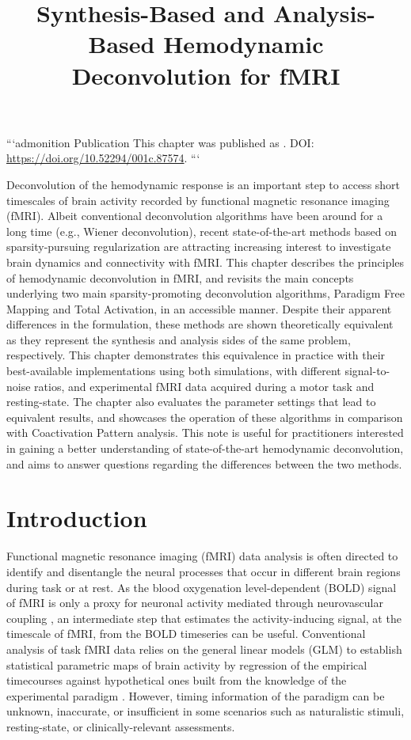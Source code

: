 \title{Synthesis-Based and Analysis-Based Hemodynamic Deconvolution for fMRI}
\label{cha:synthesis_analysis}

```{admonition} Publication
This chapter was published as
. DOI:
\url{https://doi.org/10.52294/001c.87574}.
```

Deconvolution of the hemodynamic response is an important step to access short
timescales of brain activity recorded by functional magnetic resonance imaging
(fMRI). Albeit conventional deconvolution algorithms have been around for a long
time (e.g., Wiener deconvolution), recent state-of-the-art methods based on
sparsity-pursuing regularization are attracting increasing interest to
investigate brain dynamics and connectivity with fMRI. This chapter describes
the principles of hemodynamic deconvolution in fMRI, and revisits the main
concepts underlying two main sparsity-promoting deconvolution algorithms,
Paradigm Free Mapping and Total Activation, in an accessible manner. Despite their
apparent differences in the formulation, these methods are shown theoretically
equivalent as they represent the synthesis and analysis sides of the same
problem, respectively. This chapter demonstrates this equivalence in practice
with their best-available implementations using both simulations, with different
signal-to-noise ratios, and experimental fMRI data acquired during a motor task
and resting-state. The chapter also evaluates the parameter settings that lead
to equivalent results, and showcases the operation of these algorithms in
comparison with Coactivation Pattern analysis. This note is useful for practitioners
interested in gaining a better understanding of state-of-the-art hemodynamic
deconvolution, and aims to answer questions regarding the differences between
the two methods.

\section{Introduction}
\label{sec:synthesis_introduction}

Functional magnetic resonance imaging (fMRI) data analysis is often directed to
identify and disentangle the neural processes that occur in different brain
regions during task or at rest. As the blood oxygenation level-dependent (BOLD)
signal of fMRI \citep{Ogawa1990Brainmagneticresonance} is only a proxy for
neuronal activity mediated through neurovascular coupling
\citep{Logothetis2001Neurophysiologicalinvestigationbasis}, an intermediate step
that estimates the activity-inducing signal, at the timescale of fMRI, from the
BOLD timeseries can be useful. Conventional analysis of task fMRI data relies on
the general linear models (GLM) to establish statistical parametric maps of
brain activity by regression of the empirical timecourses against hypothetical
ones built from the knowledge of the experimental paradigm
\citep{Boynton1996LinearSystemsAnalysis,Cohen1997ParametricAnalysisfMRI,Friston1998EventRelatedfMRI,Friston2008DEMvariationaltreatment}.
However, timing information of the paradigm can be unknown, inaccurate, or
insufficient in some scenarios such as naturalistic stimuli, resting-state, or
clinically-relevant assessments.

